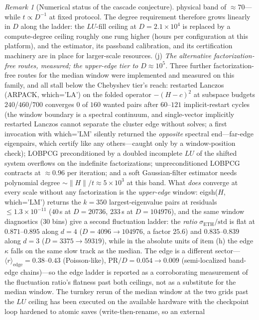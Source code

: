 \documentclass[11pt,a4paper]{article}
\theoremstyle{plain}
\theoremstyle{definition}
\theoremstyle{remark}
\newtheorem{remark}[theorem]{Remark}
\begin{document}
\begin{remark}[Numerical status of the cascade conjecture]
physical band of $\approx70$---while $t\propto D^{-1}$ at fixed protocol. The degree
requirement therefore grows linearly in $D$ along the ladder: the $LU$-fill ceiling at
$D=2.1\times10^{4}$ is replaced by a compute-degree ceiling roughly one rung higher
(hours per configuration at this platform), and the estimator, its passband calibration,
and its certification machinery are in place for larger-scale resources.
(j) \emph{The alternative factorization-free routes, measured; the upper-edge
tier to $D\approx10^{5}$.} Three further factorization-free routes for the
median window were implemented and measured on this family, and all stall
below the Chebyshev tier's reach: restarted Lanczos (ARPACK, which='LA') on
the folded operator $-(H-c)^{2}$ at subspace budgets $240$/$460$/$700$
converges $0$ of $160$ wanted pairs after $60$--$121$ implicit-restart cycles
(the window boundary is a spectral continuum, and single-vector implicitly
restarted Lanczos cannot separate the cluster edge without solves; a first
invocation with which='LM' silently returned the \emph{opposite} spectral
end---far-edge eigenpairs, which certify like any others---caught only by a
window-position check); LOBPCG preconditioned by a doubled incomplete $LU$ of
the shifted system overflows on the indefinite factorizations; unpreconditioned
LOBPCG contracts at $\approx0.96$ per iteration; and a soft Gaussian-filter
estimator needs polynomial degree $\sim\|H\|/t\approx5\times10^{3}$ at this
band. What \emph{does} converge at every scale without any factorization is the
\emph{upper-edge} window: eigsh($H$, which='LM') returns the $k=350$
largest-eigenvalue pairs at residuals $\leq1.3\times10^{-11}$
($40$\,s at $D=20736$, $233$\,s at $D=104976$), and the same
window diagnostics (30 bins) give a second fluctuation ladder: the
\emph{ratio} $\sigma_{\mathrm{ETH}}/\mathrm{std}$ is flat at
$0.871$--$0.895$ along $d=4$ ($D=4096\to104976$, a factor $25.6$) and
$0.835$--$0.839$ along $d=3$ ($D=3375\to59319$), while in the absolute units
of item (h) the edge $\kappa$ falls on the same slow track as the median. The
edge is a different sector---$\langle r\rangle_{\mathrm{edge}}=0.38$--$0.43$
(Poisson-like), $\mathrm{PR}/D=0.054\to0.009$ (semi-localized band-edge
chains)---so the edge ladder is reported as a corroborating measurement of the
fluctuation ratio's flatness past both ceilings, not as a substitute for the
median window. The turnkey rerun of the median window at the two grids past
the $LU$ ceiling has been executed on the available hardware with the
checkpoint loop hardened to atomic saves (write-then-rename, so an external

\end{remark}
\end{document}
